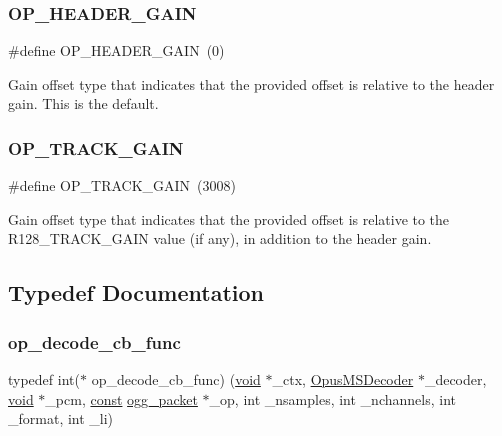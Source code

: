 \subsubsection{\texorpdfstring{O\+P\+\_\+\+H\+E\+A\+D\+E\+R\+\_\+\+G\+A\+IN}{OP\_HEADER\_GAIN}}
{\footnotesize\ttfamily \#define O\+P\+\_\+\+H\+E\+A\+D\+E\+R\+\_\+\+G\+A\+IN~(0)}

Gain offset type that indicates that the provided offset is relative to the header gain. This is the default. \mbox{\label{group__stream__decoding_ga51082f7c661488bce9bfdf0e5401fabf}} 
\subsubsection{\texorpdfstring{O\+P\+\_\+\+T\+R\+A\+C\+K\+\_\+\+G\+A\+IN}{OP\_TRACK\_GAIN}}
{\footnotesize\ttfamily \#define O\+P\+\_\+\+T\+R\+A\+C\+K\+\_\+\+G\+A\+IN~(3008)}

Gain offset type that indicates that the provided offset is relative to the R128\+\_\+\+T\+R\+A\+C\+K\+\_\+\+G\+A\+IN value (if any), in addition to the header gain. 

\subsection{Typedef Documentation}
\mbox{\label{group__stream__decoding_ga81a50874a82484034c22dfeddce177e1}} 
\subsubsection{\texorpdfstring{op\+\_\+decode\+\_\+cb\+\_\+func}{op\_decode\_cb\_func}}
{\footnotesize\ttfamily typedef int($\ast$ op\+\_\+decode\+\_\+cb\+\_\+func) (\hyperlink{png_8h_ac9c84fa68bbad002983e35ce3663c686}{void} $\ast$\+\_\+ctx, \hyperlink{group__opus__multistream_gad3497495deb9a8ace82e76cd4f93e0e4}{Opus\+M\+S\+Decoder} $\ast$\+\_\+decoder, \hyperlink{png_8h_ac9c84fa68bbad002983e35ce3663c686}{void} $\ast$\+\_\+pcm, \hyperlink{zconf_8h_a2c212835823e3c54a8ab6d95c652660e}{const} \hyperlink{structogg__packet}{ogg\+\_\+packet} $\ast$\+\_\+op, int \+\_\+nsamples, int \+\_\+nchannels, int \+\_\+format, int \+\_\+li)}

